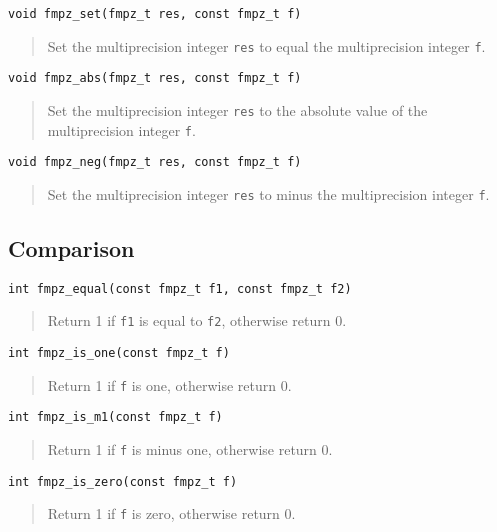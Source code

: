 \documentclass[a4paper,10pt]{article}
\newcommand{\code}{\lstinline}
\begin{document}
\begin{lstlisting}
void fmpz_set(fmpz_t res, const fmpz_t f)
\end{lstlisting}
\begin{quote}
Set the multiprecision integer \code{res} to equal the multiprecision integer \code{f}.
\end{quote}

\begin{lstlisting}
void fmpz_abs(fmpz_t res, const fmpz_t f)
\end{lstlisting}
\begin{quote}
Set the multiprecision integer \code{res} to the absolute value of the multiprecision integer \code{f}.
\end{quote}

\begin{lstlisting}
void fmpz_neg(fmpz_t res, const fmpz_t f)
\end{lstlisting}
\begin{quote}
Set the multiprecision integer \code{res} to minus the multiprecision integer \code{f}.
\end{quote}

\subsection{Comparison}

\begin{lstlisting}
int fmpz_equal(const fmpz_t f1, const fmpz_t f2)
\end{lstlisting}
\begin{quote}
Return 1 if \code{f1} is equal to \code{f2}, otherwise return 0.
\end{quote}

\begin{lstlisting}
int fmpz_is_one(const fmpz_t f)
\end{lstlisting}
\begin{quote}
Return 1 if \code{f} is one, otherwise return 0.
\end{quote}

\begin{lstlisting}
int fmpz_is_m1(const fmpz_t f)
\end{lstlisting}
\begin{quote}
Return 1 if \code{f} is minus one, otherwise return 0.
\end{quote}

\begin{lstlisting}
int fmpz_is_zero(const fmpz_t f)
\end{lstlisting}
\begin{quote}
Return 1 if \code{f} is zero, otherwise return 0.
\end{quote}
\end{document}
